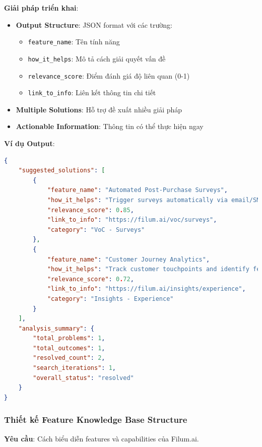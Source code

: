 \documentclass[12pt,a4paper]{article}
\begin{document}
\textbf{Giải pháp triển khai}:
\begin{itemize}
    \item \textbf{Output Structure}: JSON format với các trường:
    \begin{itemize}
        \item \texttt{feature\_name}: Tên tính năng
        \item \texttt{how\_it\_helps}: Mô tả cách giải quyết vấn đề
        \item \texttt{relevance\_score}: Điểm đánh giá độ liên quan (0-1)
        \item \texttt{link\_to\_info}: Liên kết thông tin chi tiết
    \end{itemize}
    \item \textbf{Multiple Solutions}: Hỗ trợ đề xuất nhiều giải pháp
    \item \textbf{Actionable Information}: Thông tin có thể thực hiện ngay
\end{itemize}

\textbf{Ví dụ Output}:
\begin{lstlisting}[language=json, caption=Ví dụ Output Solutions]
{
    "suggested_solutions": [
        {
            "feature_name": "Automated Post-Purchase Surveys",
            "how_it_helps": "Trigger surveys automatically via email/SMS after a transaction to collect consistent customer feedback",
            "relevance_score": 0.85,
            "link_to_info": "https://filum.ai/voc/surveys",
            "category": "VoC - Surveys"
        },
        {
            "feature_name": "Customer Journey Analytics",
            "how_it_helps": "Track customer touchpoints and identify feedback collection opportunities",
            "relevance_score": 0.72,
            "link_to_info": "https://filum.ai/insights/experience",
            "category": "Insights - Experience"
        }
    ],
    "analysis_summary": {
        "total_problems": 1,
        "total_outcomes": 1,
        "resolved_count": 2,
        "search_iterations": 1,
        "overall_status": "resolved"
    }
}
\end{lstlisting}

\subsubsection{ Thiết kế Feature Knowledge Base Structure}

\textbf{Yêu cầu}: Cách biểu diễn features và capabilities của Filum.ai.
\end{document}
